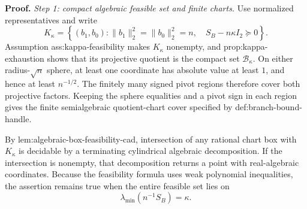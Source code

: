 \textbf{Proof.}
\emph{Step 1: compact algebraic feasible set and finite charts.}
Use normalized representatives and write
\[
 K_\kappa=\left\{(b_1,b_0):\lVert b_1\rVert_2^2=\lVert b_0\rVert_2^2=n,
 \quad S_B-n\kappa I_2\succeq0\right\}.
\]
Assumption ass:kappa-feasibility makes \(K_\kappa\) nonempty, and prop:kappa-exhaustion shows that its projective quotient is the compact set \(\mathcal B_\kappa\).  On either radius-\(\sqrt n\) sphere, at least one coordinate has absolute value at least \(1\), and hence at least \(n^{-1/2}\).  The finitely many signed pivot regions therefore cover both projective factors.  Keeping the sphere equalities and a pivot sign in each region gives the finite semialgebraic quotient-chart cover specified by def:branch-bound-handle.

By lem:algebraic-box-feasibility-cad, intersection of any rational chart box with \(K_\kappa\) is decidable by a terminating cylindrical algebraic decomposition.  If the intersection is nonempty, that decomposition returns a point with real-algebraic coordinates.  Because the feasibility formula uses weak polynomial inequalities, the assertion remains true when the entire feasible set lies on
\[
 \lambda_{\min}(n^{-1}S_B)=\kappa.
\]


